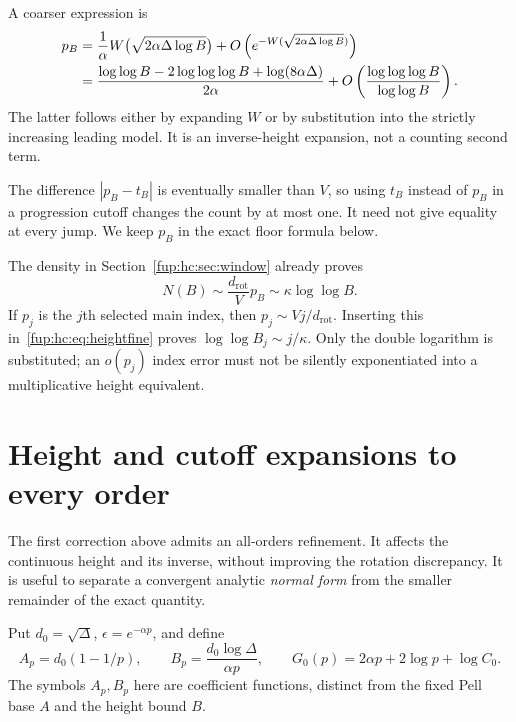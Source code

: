 \documentclass[11pt,letterpaper]{article}
\theoremstyle{definition}\newtheorem{definition}[theorem]{Definition}
\theoremstyle{remark}\newtheorem{remark}[theorem]{Remark}
\newcommand{\drot}{d_{\mathrm{rot}}}
\begin{document}
A coarser expression is
\begin{align}\label{fup:hc:eq:inverseexp}
 p_B&=\frac1\alpha W\bigl(\sqrt{2\alpha\Delta\log B}\bigr)
   +O\left(e^{-W(\sqrt{2\alpha\Delta\log B})}\right)\notag\\
 &=\frac{\log\log B-2\log\log\log B+\log(8\alpha\Delta)}{2\alpha}
     +O\left(\frac{\log\log\log B}{\log\log B}\right).
\end{align}
The latter follows either by expanding $W$ or by substitution into the strictly increasing leading model. It is an inverse-height expansion, not a counting second term.

The difference $|p_B-t_B|$ is eventually smaller than $V$, so using $t_B$ instead of $p_B$ in a progression cutoff changes the count by at most one. It need not give equality at every jump. We keep $p_B$ in the exact floor formula below.

The density in Section~\ref{fup:hc:sec:window} already proves
\[
 N(B)\sim\frac{\drot}{V}p_B\sim\kappa\log\log B.
\]
If $p_j$ is the $j$th selected main index, then $p_j\sim Vj/\drot$. Inserting this in~\eqref{fup:hc:eq:heightfine} proves $\log\log B_j\sim j/\kappa$. Only the double logarithm is substituted; an $o(p_j)$ index error must not be silently exponentiated into a multiplicative height equivalent.

\section{Height and cutoff expansions to every order}\label{fup:hc:sec:allorders}
The first correction above admits an all-orders refinement. It affects the continuous height and its inverse, without improving the rotation discrepancy. It is useful to separate a convergent analytic \emph{normal form} from the smaller remainder of the exact quantity.

Put $d_0=\sqrt\Delta$, $\epsilon=e^{-\alpha p}$, and define
\begin{equation}\label{fup:hc:eq:AB}
 A_p=d_0(1-1/p),\qquad B_p=\frac{d_0\log\Delta}{\alpha p},\qquad
 G_0(p)=2\alpha p+2\log p+\log C_0.
\end{equation}
The symbols $A_p,B_p$ here are coefficient functions, distinct from the fixed Pell base $A$ and the height bound $B$.
\end{document}
